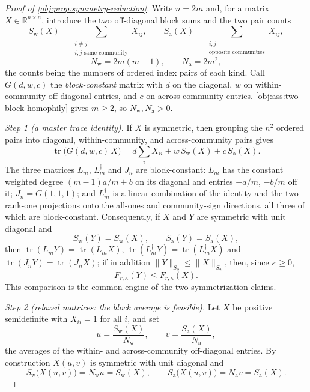 \begin{proof}[Proof of \cref{obj:prop:symmetry-reduction}]
Write \(n=2m\) and, for a matrix \(X\in\mathbb R^{n\times n}\), introduce the two off-diagonal block sums and the two pair counts
\[
S_{\mathrm{w}}(X)=\sum_{\substack{i\ne j\\ i,j\text{ same community}}}X_{ij},
\qquad
S_{\mathrm{a}}(X)=\sum_{\substack{i,j\\ \text{opposite communities}}}X_{ij},
\]
\[
N_{\mathrm{w}}=2m(m-1),
\qquad
N_{\mathrm{a}}=2m^2 ,
\]
the counts being the numbers of ordered index pairs of each kind.  Call \(G(d,w,c)\) the \emph{block-constant} matrix with \(d\) on the diagonal, \(w\) on within-community off-diagonal entries, and \(c\) on across-community entries.  \cref{obj:ass:two-block-homophily} gives \(m\ge2\), so \(N_{\mathrm{w}},N_{\mathrm{a}}>0\).

\emph{Step 1 (a master trace identity).}  If \(X\) is symmetric, then grouping the \(n^2\) ordered pairs into diagonal, within-community, and across-community pairs gives
\[
\operatorname{tr}\bigl(G(d,w,c)\,X\bigr)
=d\sum_{i}X_{ii}+w\,S_{\mathrm{w}}(X)+c\,S_{\mathrm{a}}(X).
\]
The three matrices \(L_m\), \(L_m^\dagger\) and \(J_n\) are block-constant: \(L_m\) has the constant weighted degree \((m-1)a/m+b\) on its diagonal and entries \(-a/m\), \(-b/m\) off it; \(J_n=G(1,1,1)\); and \(L_m^\dagger\) is a linear combination of the identity and the two rank-one projections onto the all-ones and community-sign directions, all three of which are block-constant.  Consequently, if \(X\) and \(Y\) are symmetric with unit diagonal and
\[
S_{\mathrm{w}}(Y)=S_{\mathrm{w}}(X),
\qquad
S_{\mathrm{a}}(Y)=S_{\mathrm{a}}(X),
\]
then \(\operatorname{tr}(L_mY)=\operatorname{tr}(L_mX)\), \(\operatorname{tr}(L_m^\dagger Y)=\operatorname{tr}(L_m^\dagger X)\) and \(\operatorname{tr}(J_nY)=\operatorname{tr}(J_nX)\); if in addition \(\|Y\|_{S_2}\le\|X\|_{S_2}\), then, since \(\kappa\ge0\),
\[
F_{r,\kappa}(Y)\le F_{r,\kappa}(X).
\]
This comparison is the common engine of the two symmetrization claims.

\emph{Step 2 (relaxed matrices: the block average is feasible).}  Let \(X\) be positive semidefinite with \(X_{ii}=1\) for all \(i\), and set
\[
u=\frac{S_{\mathrm{w}}(X)}{N_{\mathrm{w}}},
\qquad
v=\frac{S_{\mathrm{a}}(X)}{N_{\mathrm{a}}},
\]
the averages of the within- and across-community off-diagonal entries.  By construction \(X(u,v)\) is symmetric with unit diagonal and
\[
S_{\mathrm{w}}\bigl(X(u,v)\bigr)=N_{\mathrm{w}}u=S_{\mathrm{w}}(X),
\qquad
S_{\mathrm{a}}\bigl(X(u,v)\bigr)=N_{\mathrm{a}}v=S_{\mathrm{a}}(X).
\]


\end{proof}
